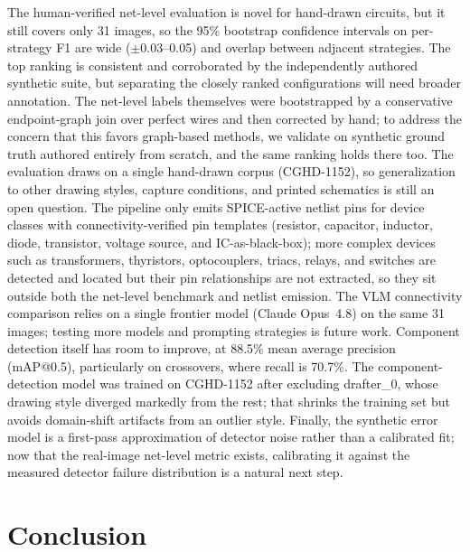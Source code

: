 \documentclass{ieeeaccess}
\begin{document}
The human-verified net-level evaluation is novel for hand-drawn circuits, but it still covers only 31 images, so the 95\% bootstrap confidence intervals on per-strategy F1 are wide ($\pm$0.03--0.05) and overlap between adjacent strategies. The top ranking is consistent and corroborated by the independently authored synthetic suite, but separating the closely ranked configurations will need broader annotation. The net-level labels themselves were bootstrapped by a conservative endpoint-graph join over perfect wires and then corrected by hand; to address the concern that this favors graph-based methods, we validate on synthetic ground truth authored entirely from scratch, and the same ranking holds there too. The evaluation draws on a single hand-drawn corpus (CGHD-1152), so generalization to other drawing styles, capture conditions, and printed schematics is still an open question. The pipeline only emits SPICE-active netlist pins for device classes with connectivity-verified pin templates (resistor, capacitor, inductor, diode, transistor, voltage source, and IC-as-black-box); more complex devices such as transformers, thyristors, optocouplers, triacs, relays, and switches are detected and located but their pin relationships are not extracted, so they sit outside both the net-level benchmark and netlist emission. The VLM connectivity comparison relies on a single frontier model (Claude Opus~4.8) on the same 31 images; testing more models and prompting strategies is future work. Component detection itself has room to improve, at 88.5\% mean average precision (mAP@0.5), particularly on crossovers, where recall is 70.7\%. The component-detection model was trained on CGHD-1152 after excluding drafter\_0, whose drawing style diverged markedly from the rest; that shrinks the training set but avoids domain-shift artifacts from an outlier style. Finally, the synthetic error model is a first-pass approximation of detector noise rather than a calibrated fit; now that the real-image net-level metric exists, calibrating it against the measured detector failure distribution is a natural next step.

\section{Conclusion}
\end{document}
